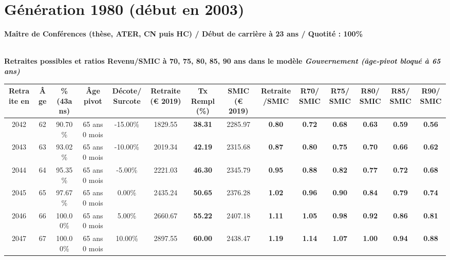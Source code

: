 \newpage 
 
\section{Génération 1980 (début en 2003)\label{MCF_100_1980_23_0}} 
 
{\bf \noindent Maître de Conférences (thèse, ATER, CN puis HC) / Début de carrière à 23 ans / Quotité : 100\%}  ~ 

 ~\\{\bf \noindent Retraites possibles et ratios Revenu/SMIC à 70, 75, 80, 85, 90 ans dans le modèle \emph{Gouvernement (âge-pivot bloqué à 65 ans)}}  
 
\begin{adjustbox}{max width=\textwidth} 
\begin{tabular}[htb]{|c|c||c|c|c||c|c||c|c||c|c|c|c|c|} 
\hline 
 Retraite en &  Âge &  \%(43ans) &  Âge pivot &  Décote/Surcote &  Retraite (\euro{} 2019) &  Tx Rempl(\%) &  SMIC (\euro{} 2019) &  Retraite/SMIC &  R70/SMIC &  R75/SMIC &  R80/SMIC &  R85/SMIC &  R90/SMIC \\ 
\hline \hline 
 2042 &  62 &  90.70\% &  65 ans 0 mois &  -15.00\% &  1829.55 &  {\bf 38.31} &  2285.97 &  {\bf {\color{red} 0.80}} &  {\bf {\color{red} 0.72}} &  {\bf {\color{red} 0.68}} &  {\bf {\color{red} 0.63}} &  {\bf {\color{red} 0.59}} &  {\bf {\color{red} 0.56}} \\ 
\hline 
 2043 &  63 &  93.02\% &  65 ans 0 mois &  -10.00\% &  2019.34 &  {\bf 42.19} &  2315.68 &  {\bf {\color{red} 0.87}} &  {\bf {\color{red} 0.80}} &  {\bf {\color{red} 0.75}} &  {\bf {\color{red} 0.70}} &  {\bf {\color{red} 0.66}} &  {\bf {\color{red} 0.62}} \\ 
\hline 
 2044 &  64 &  95.35\% &  65 ans 0 mois &  -5.00\% &  2221.03 &  {\bf 46.30} &  2345.79 &  {\bf {\color{red} 0.95}} &  {\bf {\color{red} 0.88}} &  {\bf {\color{red} 0.82}} &  {\bf {\color{red} 0.77}} &  {\bf {\color{red} 0.72}} &  {\bf {\color{red} 0.68}} \\ 
\hline 
 2045 &  65 &  97.67\% &  65 ans 0 mois &  0.00\% &  2435.24 &  {\bf 50.65} &  2376.28 &  {\bf 1.02} &  {\bf {\color{red} 0.96}} &  {\bf {\color{red} 0.90}} &  {\bf {\color{red} 0.84}} &  {\bf {\color{red} 0.79}} &  {\bf {\color{red} 0.74}} \\ 
\hline 
 2046 &  66 &  100.00\% &  65 ans 0 mois &  5.00\% &  2660.67 &  {\bf 55.22} &  2407.18 &  {\bf 1.11} &  {\bf 1.05} &  {\bf {\color{red} 0.98}} &  {\bf {\color{red} 0.92}} &  {\bf {\color{red} 0.86}} &  {\bf {\color{red} 0.81}} \\ 
\hline 
 2047 &  67 &  100.00\% &  65 ans 0 mois &  10.00\% &  2897.55 &  {\bf 60.00} &  2438.47 &  {\bf 1.19} &  {\bf 1.14} &  {\bf 1.07} &  {\bf 1.00} &  {\bf {\color{red} 0.94}} &  {\bf {\color{red} 0.88}} \\ 
\hline 
\hline 
\end{tabular} 
\end{adjustbox} 
 

